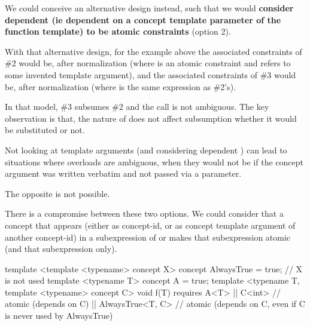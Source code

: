 \documentclass{wg21}
\begin{document}
We could conceive an alternative design instead, such that we would \textbf{consider dependent  (ie dependent on a concept template parameter of the function template) to be atomic constraints} (option 2).

With that alternative design, for the example above the associated constraints of \#2 would be, after normalization  (where  is an atomic constraint and  refers to some invented template argument), and the associated constraints of \#3 would be, after normalization  (where  is the same expression as \#2's).

In that model, \#3 subsumes \#2 and the call is not ambiguous.
The key observation is that, the nature of  does not affect subsumption whether it would be substituted or not.

Not looking at template arguments (and considering dependent ) can lead to situations where
overloads are ambiguous, when they would not be if the concept argument was written verbatim and not passed via a parameter.


The opposite is not possible.

There is a compromise between these two options. We could consider
that a concept that appears (either as concept-id, or as concept template argument of another concept-id) in a subexpression of \tcode{\&\&} or \tcode{||}
makes that subexpression atomic (and that subexpression only).

\begin{colorblock}
template <template <typename> concept X>
concept AlwaysTrue = true; // X is not used
template <typename T>
concept A = true;
template <typename T, template <typename> concept C>
void f(T) requires
A<T>
|| C<int>  // atomic (depends on C)
|| AlwaysTrue<T, C> {}  // atomic (depends on C, even if C is never used by AlwaysTrue)
\end{colorblock}
\end{document}

